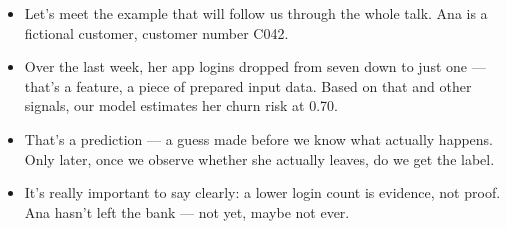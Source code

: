 \documentclass[11pt,a4paper]{article}
\begin{document}
\begin{examplebox}[title after break={SPOKEN SCRIPT --- slide 4 continued}]
\begin{itemize}
\item Let's meet the example that will follow us through the whole talk. Ana is a fictional customer, customer number C042.
\item Over the last week, her app logins dropped from seven down to just one — that's a feature, a piece of prepared input data. Based on that and other signals, our model estimates her churn risk at 0.70.
\item That's a prediction — a guess made before we know what actually happens. Only later, once we observe whether she actually leaves, do we get the label.
\item It's really important to say clearly: a lower login count is evidence, not proof. Ana hasn't left the bank — not yet, maybe not ever.
\end{itemize}
\end{examplebox}
\par\noindent{\scriptsize\textcolor{teal!60!black}{Reading anchor: Bass, Ch. 14}}
\clearpage
\end{document}
